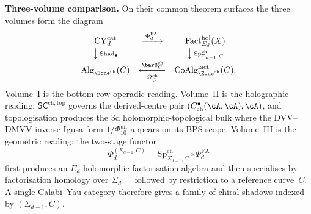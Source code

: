 \medskip
\noindent\textbf{Three-volume comparison.}\enspace
On their common theorem surfaces the three volumes form the diagram
\[
\begin{array}{ccc}
\mathrm{CY}_d^{\mathrm{cat}}
& \xrightarrow{\;\Phi^{\mathrm{FA}}_d\;}
& \mathrm{Fact}^{\mathrm{hol}}_{E_d}(X) \\[2pt]
\big\downarrow\,{\scriptstyle\mathrm{Shad}_\bullet}
& & \big\downarrow\,{\scriptstyle
\mathrm{Sp}^{\mathrm{ch}}_{\Sigma_{d-1},C}} \\[2pt]
\mathrm{Alg}_{\Eone^{\mathrm{ch}}}(C)
& \xleftarrow[\;\Omega_C^{\mathrm{ch}}\;]{\barB_C^{\mathrm{ch}}}
& \mathrm{CoAlg}^{\mathrm{fact}}_{\Eone^{\mathrm{ch}}}(C).
\end{array}
\]
Volume~I is the bottom-row operadic reading. Volume~II is the
holographic reading: $\mathsf{SC}^{\mathrm{ch,top}}$ governs the
derived-centre pair $(C^\bullet_{\mathrm{ch}}(\cA,\cA),\cA)$, and
topologisation produces the $3$d holomorphic-topological bulk where
the DVV--DMVV inverse Igusa form $1/\Phi_{10}^{\mathrm{un}}$
appears on its BPS scope.
Volume~III is the geometric reading: the two-stage functor
\[
 \Phi_d^{(\Sigma_{d-1},C)}=
 \mathrm{Sp}^{\mathrm{ch}}_{\Sigma_{d-1},C}\circ\Phi_d^{\mathrm{FA}}
\]
first produces an $E_d$-holomorphic factorisation algebra and then
specialises by factorisation homology over $\Sigma_{d-1}$ followed by
restriction to a reference curve~$C$. A single Calabi--Yau category
therefore gives a family of chiral shadows indexed by
$(\Sigma_{d-1},C)$.

